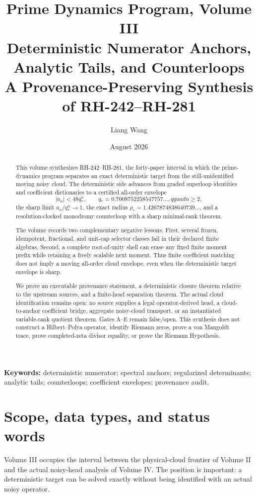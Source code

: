 \documentclass[11pt]{article}
\title{\textbf{Prime Dynamics Program, Volume III}\\
\Large Deterministic Numerator Anchors, Analytic Tails, and Counterloops\\
\large A Provenance-Preserving Synthesis of RH-242--RH-281}
\author{Liang Wang}
\date{August 2026}
\theoremstyle{definition}
\theoremstyle{remark}
\begin{document}
\maketitle

\begin{abstract}
This volume synthesizes RH-242--RH-281, the forty-paper interval in which the
prime-dynamics program separates an exact deterministic target from the
still-unidentified moving noisy cloud.  The deterministic side advances from
graded superloop identities and coefficient dictionaries to a certified
all-order envelope
\[
 |a_n|<48q_*^n,\qquad q_*=0.7008752258547757\ldots,qquad n\ge2,
\]
the sharp limit $a_n/q_*^n\to1$, the exact radius
$\rho_*=1.4267874838640739\ldots$, and a resolution-clocked monodromy
counterloop with a sharp minimal-rank theorem.

The volume records two complementary negative lessons.  First, several
frozen, idempotent, fractional, and unit-cap selector classes fail in their
declared finite algebras.  Second, a complete root-of-unity shell can erase
any fixed finite moment prefix while retaining a freely scalable next moment.
Thus finite coefficient matching does not imply a moving all-order cloud
envelope, even when the deterministic target envelope is sharp.

We prove an executable provenance statement, a deterministic closure theorem
relative to the upstream sources, and a finite-head separation theorem.  The
actual cloud identification remains open: no source supplies a legal
operator-derived head, a cloud-to-anchor coefficient bridge, aggregate
noisy-cloud transport, or an instantiated variable-rank quotient theorem.
Gates A--E remain false/open.  This synthesis does not construct a
Hilbert--Polya operator, identify Riemann zeros, prove a von Mangoldt trace,
prove completed-zeta divisor equality, or prove the Riemann Hypothesis.
\end{abstract}

\noindent\textbf{Keywords:} deterministic numerator; spectral anchors;
regularized determinants; analytic tails; counterloops; coefficient
envelopes; provenance audit.

\section{Scope, data types, and status words}

Volume III occupies the interval between the physical-cloud frontier of
Volume II and the actual noisy-head analysis of Volume IV.  The position is
important: a deterministic target can be solved exactly without being
identified with an actual noisy operator.
\end{document}
